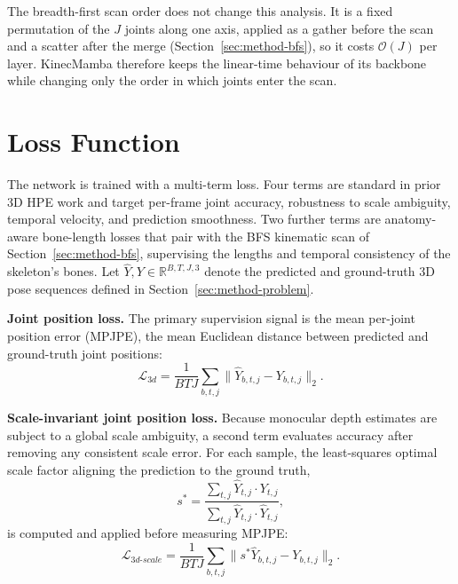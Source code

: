 The breadth-first scan order does not change this analysis. It is a fixed
permutation of the $J$ joints along one axis, applied as a gather before the
scan and a scatter after the merge (Section~\ref{sec:method-bfs}), so it costs
$\mathcal{O}(J)$ per layer. KinecMamba therefore keeps the linear-time
behaviour of its backbone while changing only the order in which joints enter
the scan.

\section{Loss Function}
\label{sec:method-loss}

The network is trained with a multi-term loss. Four terms are standard in
prior 3D HPE work \cite{zhang2022mixste, zhu2023motionbert,
mehraban2024motionagformer} and target per-frame joint accuracy, robustness
to scale ambiguity, temporal velocity, and prediction smoothness. Two
further terms are anatomy-aware bone-length losses that pair with the BFS
kinematic scan of Section~\ref{sec:method-bfs}, supervising the lengths and
temporal consistency of the skeleton's bones. Let $\hat{Y}, Y \in
\mathbb{R}^{B,T,J,3}$ denote the predicted and ground-truth 3D pose sequences
defined in Section~\ref{sec:method-problem}.

\textbf{Joint position loss.} The primary supervision signal is the mean
per-joint position error (MPJPE), the mean Euclidean distance between
predicted and ground-truth joint positions:
\begin{equation}
\mathcal{L}_{3d} = \frac{1}{BTJ} \sum_{b,t,j} \big\lVert \hat{Y}_{b,t,j} - Y_{b,t,j} \big\rVert_2 .
\end{equation}

\textbf{Scale-invariant joint position loss.} Because monocular depth
estimates are subject to a global scale ambiguity, a second term evaluates
accuracy after removing any consistent scale error. For each sample, the
least-squares optimal scale factor aligning the prediction to the ground
truth,
\begin{equation}
s^{*} = \frac{\sum_{t,j} \hat{Y}_{t,j} \cdot Y_{t,j}}{\sum_{t,j} \hat{Y}_{t,j} \cdot \hat{Y}_{t,j}},
\end{equation}
is computed and applied before measuring MPJPE:
\begin{equation}
\mathcal{L}_{3d\text{-}scale} = \frac{1}{BTJ} \sum_{b,t,j} \big\lVert s^{*} \hat{Y}_{b,t,j} - Y_{b,t,j} \big\rVert_2 .
\end{equation}

